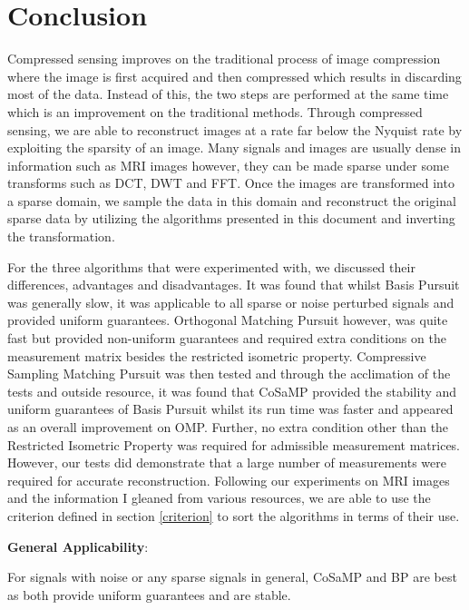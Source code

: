 \documentclass[titlepage,oneside, 12pt]{book}
\theoremstyle{break}
\begin{document}
\newpage

\chapter{Conclusion}

Compressed sensing improves on the traditional process of image compression where the image is first acquired and then compressed which results in discarding most of the data. Instead of this, the two steps are performed at the same time which is an improvement on the traditional methods. 
Through compressed sensing, we are able to reconstruct images at a rate far below the Nyquist rate by exploiting the sparsity of an image. Many signals and images are usually dense in information such as MRI images however, they can be made sparse under some transforms such as DCT, DWT and FFT. Once the images are transformed into a sparse domain, we sample the data in this domain and reconstruct the original sparse data by utilizing the algorithms presented  in this document and inverting the transformation. 

For the three algorithms that were experimented with, we discussed their differences, advantages and disadvantages. It was found that whilst Basis Pursuit was generally slow, it was applicable to all sparse or noise perturbed signals and provided uniform guarantees. Orthogonal Matching Pursuit however, was quite fast but provided non-uniform guarantees and required extra conditions on the measurement matrix besides the restricted isometric property. Compressive Sampling Matching Pursuit was then tested and through the acclimation of the tests and outside resource, it was found that CoSaMP provided the stability and uniform guarantees of Basis Pursuit whilst its run time was faster and appeared as an overall improvement on OMP. Further, no extra condition other than the Restricted Isometric Property was required for admissible measurement matrices. However, our tests did demonstrate that a large number of measurements were required for accurate reconstruction.
\newpage
Following our experiments on MRI images and the information I gleaned from various resources, we are able to use the criterion defined in section \ref{criterion} to sort the algorithms in terms of their use. 

\begin{flushleft}
\textbf{General Applicability}:
\end{flushleft}
For signals with noise or any sparse signals in general, CoSaMP and BP are best as both provide uniform guarantees and are stable. 
\end{document}
